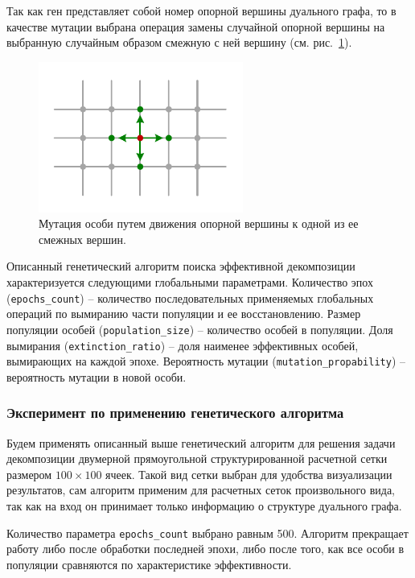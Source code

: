 Так как ген представляет собой номер опорной вершины дуального графа, то в качестве мутации выбрана операция замены случайной опорной вершины на выбранную случайным образом смежную с ней вершину (см. рис.~\ref{fig:text_2_genetic_mutation}).

\begin{figure}[ht]
\centering
\includegraphics[width=0.6\textwidth]{./pics/text_2_genetic/mutation.pdf}
\caption{Мутация особи путем движения опорной вершины к одной из ее смежных вершин.}
\label{fig:text_2_genetic_mutation}
\end{figure}

Описанный генетический алгоритм поиска эффективной декомпозиции характеризуется следующими глобальными параметрами. Количество эпох (\texttt{epochs\_count}) -- количество последовательных применяемых глобальных операций по вымиранию части популяции и ее восстановлению.
Размер популяции особей (\texttt{population\_size}) -- количество особей в популяции.
Доля вымирания (\texttt{extinction\_ratio}) – доля наименее эффективных особей, вымирающих на каждой эпохе.
Вероятность мутации (\texttt{mutation\_propability}) -- вероятность мутации в новой особи.

\subsubsection{Эксперимент по применению генетического алгоритма}

Будем применять описанный выше генетический алгоритм для решения задачи декомпозиции двумерной прямоугольной структурированной расчетной сетки размером $100 \times 100$ ячеек.
Такой вид сетки выбран для удобства визуализации результатов, сам алгоритм применим для расчетных сеток произвольного вида, так как на вход он принимает только информацию о структуре дуального графа.

Количество параметра \texttt{epochs\_count} выбрано равным 500.
Алгоритм прекращает работу либо после обработки последней эпохи, либо после того, как все особи в популяции сравняются по характеристике эффективности.

